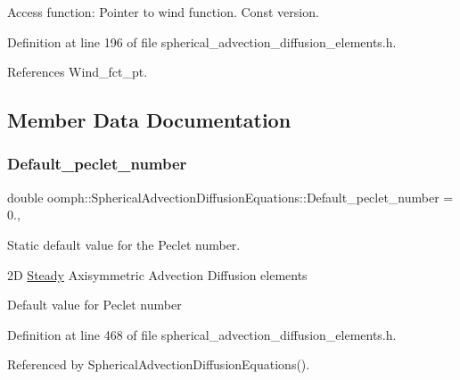 Access function\+: Pointer to wind function. Const version. 



Definition at line 196 of file spherical\+\_\+advection\+\_\+diffusion\+\_\+elements.\+h.



References Wind\+\_\+fct\+\_\+pt.



\subsection{Member Data Documentation}
\mbox{\label{classoomph_1_1SphericalAdvectionDiffusionEquations_ab28f6e9b6c44a405e7ee7611df43e7c7}} 
\subsubsection{\texorpdfstring{Default\+\_\+peclet\+\_\+number}{Default\_peclet\_number}}
{\footnotesize\ttfamily double oomph\+::\+Spherical\+Advection\+Diffusion\+Equations\+::\+Default\+\_\+peclet\+\_\+number = 0.\hspace{0.3cm}{\ttfamily [static]}, {\ttfamily [private]}}



Static default value for the Peclet number. 

2D \hyperlink{classoomph_1_1Steady}{Steady} Axisymmetric Advection Diffusion elements

Default value for Peclet number 

Definition at line 468 of file spherical\+\_\+advection\+\_\+diffusion\+\_\+elements.\+h.



Referenced by Spherical\+Advection\+Diffusion\+Equations().

\mbox{\label{classoomph_1_1SphericalAdvectionDiffusionEquations_ab650e6ff8db720b2c7d061f885f1c628}} 
